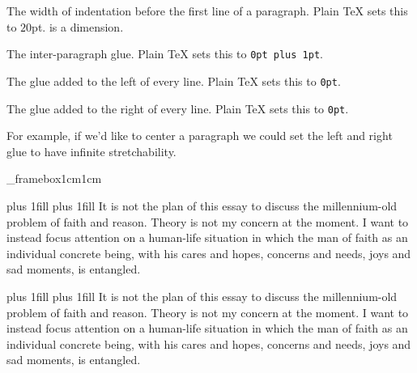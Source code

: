 {{    \textbox\empty{5cm}{\lastoy}{\hsize-6cm}{}
        The width of indentation before the first line of a paragraph.
        Plain \TeX{} sets this to $20$pt.
        \macroname\parindent{} is a dimension.
    \endtextbox

    \textbox{}
        \centerline{\color{white}\macroname\parskip}
    \endtextbox

    \textbox\empty{5cm}{\lastoy}{\hsize-6cm}{}
        The inter-paragraph glue.
        Plain \TeX{} sets this to {\tt 0pt plus 1pt}.
    \endtextbox

    \textbox{}
        \centerline{\color{white}\macroname\leftskip}
    \endtextbox

    \textbox\empty{5cm}{\lastoy}{\hsize-6cm}{}
        The glue added to the left of every line.
        Plain \TeX{} sets this to {\tt 0pt}.
    \endtextbox

    \textbox{}
        \centerline{\color{white}\macroname\rightskip}
    \endtextbox

    \textbox\empty{5cm}{\lastoy}{\hsize-6cm}{}
        The glue added to the right of every line.
        Plain \TeX{} sets this to {\tt 0pt}.
    \endtextbox

    \textbox\empty{1cm}{\lastey+.5cm}{\hsize-2cm}{}
        For example, if we'd like to center a paragraph we could set the left and right glue to have infinite stretchability.
    \endtextbox

\endslide

\beginslide
    \bheadline

    \textbox\_framebox{1cm}{1cm}{\hsize-2cm}{}
\beginhi
{\parindent=0pt
\leftskip=0pt plus 1fill \rightskip=0pt plus 1fill\relax
It is not the plan of this essay to discuss the
millennium-old problem of faith and reason. Theory is not
my concern at the moment. I want to instead focus attention
on a human-life situation in which the man of faith as an
individual concrete being, with his cares and hopes,
concerns and needs, joys and sad moments, is entangled.
\par
}
\endhi
    \endtextbox

    \textbox{}
        {\parindent=0pt
        \leftskip=0pt plus 1fill \rightskip=0pt plus 1fill\relax
        It is not the plan of this essay to discuss the
        millennium-old problem of faith and reason. Theory is not
        my concern at the moment. I want to instead focus attention
        on a human-life situation in which the man of faith as an
        individual concrete being, with his cares and hopes,
        concerns and needs, joys and sad moments, is entangled.
        \par
        }
    \endtextbox

}}

